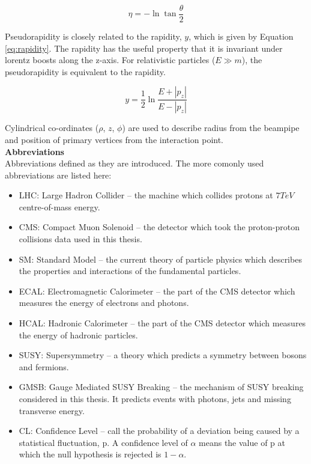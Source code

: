 \begin{equation}
\eta = -\ln\tan\frac{\theta}{2}
\label{eq:pseudorapidity}
\end{equation}

Pseudorapidity is closely related to the rapidity, $y$, which is given by
Equation \ref{eq:rapidity}. The rapidity has the useful property that it is
invariant under lorentz boosts along the z-axis. For relativistic particles ($E 
\gg m$), the pseudorapidity is equivalent to the rapidity.

\begin{equation}
y = \frac{1}{2}\ln\frac{E + |p_{z}|}{E - |p_{z}|}
\label{eq:rapidity}
\end{equation}

Cylindrical co-ordinates ($\rho$, $z$, $\phi$) are used to describe radius from 
the beampipe and position of primary vertices from the interaction point. \\

{\bf Abbreviations} \\

Abbreviations defined as they are introduced. The more comonly used
abbreviations are listed here:

\begin{itemize}
\item LHC: Large Hadron Collider -- the machine which collides protons at
$7\unit{TeV}$ centre-of-mass energy.
\item CMS: Compact Muon Solenoid -- the detector which took the proton-proton
collisions data used in this thesis.
\item SM: Standard Model -- the current theory of particle physics which
describes the properties and interactions of the fundamental particles.
\item ECAL: Electromagnetic Calorimeter -- the part of the CMS detector which 
measures the energy of electrons and photons.
\item HCAL: Hadronic Calorimeter -- the part of the CMS detector which measures
the energy of hadronic particles.
\item SUSY: Supersymmetry -- a theory which predicts a symmetry between bosons
and fermions. 
\item GMSB: Gauge Mediated SUSY Breaking -- the mechanism of SUSY breaking
considered in this thesis. It predicts events with photons, jets and missing
transverse energy.
\item CL: Confidence Level -- call the probability of a deviation being caused
by a statistical fluctuation, p. A confidence level of $\alpha$ means the value 
of p at which the null hypothesis is rejected is $1-\alpha$.
\end{itemize}

